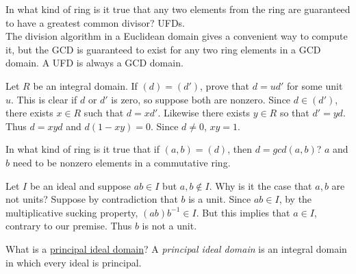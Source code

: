 \documentclass[avery5371,grid]{flashcards}
\newcommand{\inv}{^{-1}}
\begin{document}
\begin{flashcard}[Rings]{In what kind of ring is it true that any two elements from the ring are guaranteed to have a greatest common divisor?}
 UFDs.\\
 
 The division algorithm in a Euclidean domain gives a convenient way to compute it, but the GCD is guaranteed to exist for any two ring elements in a GCD domain. A UFD is always a GCD domain.
\end{flashcard}

\begin{flashcard}[Rings]{Let $R$ be an integral domain. If $(d) = (d')$, prove that $d = u d'$ for some unit $u$.}
  This is clear if $d$ or $d'$ is zero, so suppose both are nonzero. Since $d \in (d')$, there exists $x \in R$ such that $d = x d'$. Likewise there exists $y \in R$ so that $d' = y d.$ Thus $d = xyd$ and $d(1-xy) = 0$. Since $d \neq 0$, $xy = 1.$
\end{flashcard}

\begin{flashcard}[Rings]{In what kind of ring is it true that if $(a,b) = (d)$, then $d = gcd(a,b)$?}
 $a$ and $b$ need to be nonzero elements in a commutative ring.
\end{flashcard}

\begin{flashcard}[Rings]{Let $I$ be an ideal and suppose $ab \in I$ but $a,b \notin I$. Why is it the case that $a,b$ are not units?}
 Suppose by contradiction that $b$ is a unit. Since $ab \in I$, by the multiplicative sucking property, $(ab)b \inv \in I$. But this implies that $a \in I$, contrary to our premise. Thus $b$ is not a unit.
\end{flashcard}

\begin{flashcard}[Rings]{What is a \underline{principal ideal domain}?}
 A \emph{principal ideal domain} is an integral domain in which every ideal is principal.
\end{flashcard}
\end{document}
